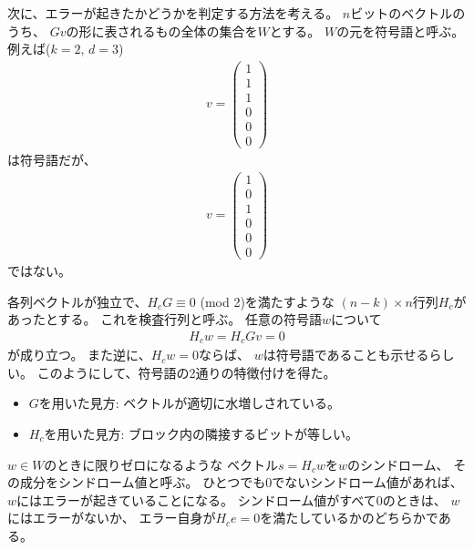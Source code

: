 \documentclass[]{ltjsarticle}
\begin{document}
次に、エラーが起きたかどうかを判定する方法を考える。
$n$ビットのベクトルのうち、
$Gv$の形に表されるもの全体の集合を$W$とする。
$W$の元を符号語と呼ぶ。
例えば($k=2$, $d=3$)
\begin{align}
    v = 
    \begin{pmatrix}
    1 \\ 1 \\ 1 \\ 0 \\ 0 \\ 0    
    \end{pmatrix}
\end{align}
は符号語だが、
\begin{align}
    v = 
    \begin{pmatrix}
    1 \\ 0 \\ 1 \\ 0 \\ 0 \\ 0
    \end{pmatrix}
\end{align}
ではない。

各列ベクトルが独立で、$H_cG\equiv 0$ (mod 2)を満たすような
$(n-k) \times n$行列$H_c$があったとする。
これを検査行列と呼ぶ。
任意の符号語$w$について
\begin{align}
    H_c w = H_c Gv = 0
\end{align}
が成り立つ。
また逆に、$H_c w = 0$ならば、
$w$は符号語であることも示せるらしい。
このようにして、符号語の2通りの特徴付けを得た。
\begin{itemize}
    \item $G$を用いた見方: ベクトルが適切に水増しされている。
    \item $H_c$を用いた見方: ブロック内の隣接するビットが等しい。
\end{itemize}

$w \in W$のときに限りゼロになるような
ベクトル$s = H_c w$を$w$のシンドローム、
その成分をシンドローム値と呼ぶ。
ひとつでも0でないシンドローム値があれば、
$w$にはエラーが起きていることになる。
シンドローム値がすべて0のときは、
$w$にはエラーがないか、
エラー自身が$H_c e = 0$を満たしているかのどちらかである。
\end{document}
